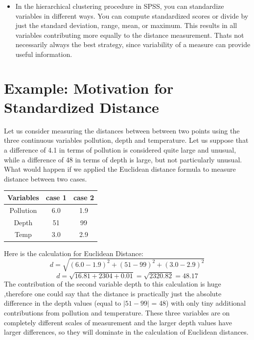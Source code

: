 \documentclass[a4paper,12pt]{report}
\begin{document}
\begin{itemize}
\begin{itemize}
	\item In the hierarchical clustering procedure in SPSS, you can standardize variables in
	different ways. You can compute standardized scores or divide by just the standard
	deviation, range, mean, or maximum. This results in all variables contributing more
	equally to the distance measurement. Thats not necessarily always the best strategy,
	since variability of a measure can provide useful information. 
	
\end{itemize}
\newpage


\section{Example: Motivation for Standardized Distance}

Let us consider measuring the distances between between two points using
the three continuous variables pollution, depth and temperature. Let us suppose that a difference of 4.1 in terms of pollution is considered quite large and unusual, while a difference of 48 in terms of depth is large, but not particularly unusual.
What would happen if we applied the Euclidean distance formula to measure distance between two cases.
\begin{center}
	\begin{tabular}{|c|c|c|}
		\hline
		Variables & case 1 & case 2 \\ \hline 
		Pollution & 6.0 & 1.9 \\
		Depth & 51 & 99 \\
		Temp & 3.0 & 2.9 \\
		\hline
	\end{tabular}
\end{center}

Here is the calculation for Euclidean Distance:
\[ d = \sqrt{(6.0 - 1.9)^2 + (51 - 99)^2 + (3.0 - 2.9)^2}   \]
\[ d = \sqrt{16.81 + 2304 + 0.01} = \sqrt{2320.82} = 48.17 \]
\noindent The contribution of the second variable depth to this calculation is huge ,therefore one could say
that the distance is practically just the absolute difference in the depth values (equal to
$|51-99|$ = 48) with only tiny additional contributions from pollution and temperature. These three variables are on
completely different scales of measurement and the larger depth values have larger differences, so they will dominate in the calculation of Euclidean distances.



\end{itemize}
\end{document}
